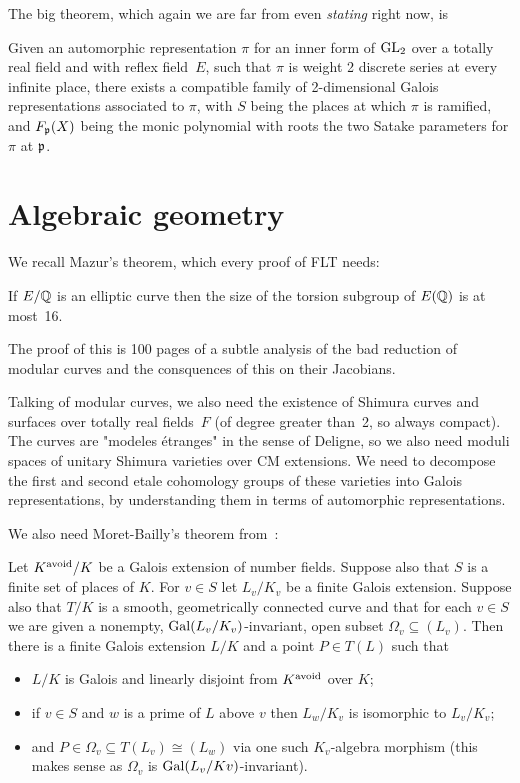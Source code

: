 The big theorem, which again we are far from even \emph{stating} right now, is

\begin{theorem} Given an automorphic representation $\pi$ for an inner form of $\operatorname{GL}_2$ over a totally real field and with reflex field~$E$, such that $\pi$ is weight 2 discrete series at every infinite place, there exists a compatible family of 2-dimensional Galois representations associated to $\pi$, with $S$ being the places at which $\pi$ is ramified, and $F_{{\mathfrak{p}}}(X)$ being the monic polynomial with roots the two Satake parameters for $\pi$ at ${\mathfrak{p}}$.
\end{theorem}

\section{Algebraic geometry}

We recall Mazur's theorem, which every proof of FLT needs:

\begin{theorem} If $E/\mathbb{Q}$ is an elliptic curve then the size of the torsion subgroup of $E(\mathbb{Q})$ is at most~16.
\end{theorem}

The proof of this is 100 pages of a subtle analysis of the bad reduction of modular curves and the consquences of this on their Jacobians.

Talking of modular curves, we also need the existence of Shimura curves and surfaces over totally real fields~$F$ (of degree greater than~2, so always compact). The curves are "modeles \'etranges" in the sense of Deligne, so we also need moduli spaces of unitary Shimura varieties over CM extensions. We need to decompose the first and second etale cohomology groups of these varieties into Galois representations, by understanding them
in terms of automorphic representations.

We also need Moret-Bailly's theorem from~\cite{moret-bailly}:

\begin{theorem} Let $K^{\operatorname{avoid}}/K$ be a Galois extension of number fields. Suppose also
that $S$ is a finite set of places of $K$. For $v\in S$ let $L_v/K_v$ be a finite Galois extension.
Suppose also that $T /K$ is a smooth, geometrically connected curve and that for each
$v\in S$ we are given a nonempty, $\operatorname{Gal}(L_v/K_v)$-invariant, open subset $\Omega_v\subseteq (L_v)$.
Then there is a finite Galois extension $L/K$ and a point $P ∈ T (L)$ such that
\begin{itemize}
\item $L/K$ is Galois and linearly disjoint from $K^{\operatorname{avoid}}$ over $K$;
\item if $v\in S$ and $w$ is a prime of $L$ above $v$ then $L_w /K_v$ is isomorphic to $L_v/K_v$;
\item and $P \in\Omega_v\subseteq T (L_v) \cong (L_w)$ via one such $K_v$-algebra morphism
(this makes sense as $\Omega_v$ is $\operatorname{Gal}(L_v/K v)$-invariant).
\end{itemize}
\end{theorem}

